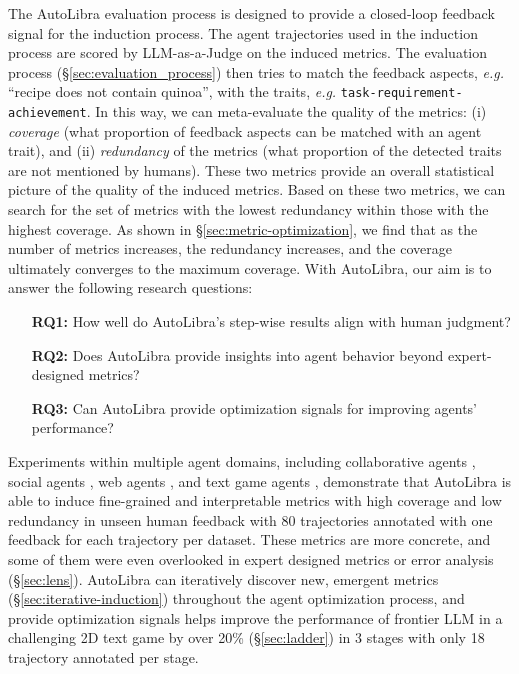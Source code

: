 The AutoLibra evaluation process is designed to provide a closed-loop feedback signal
for the induction process. The agent trajectories used in the induction process
are scored by LLM-as-a-Judge \citep{zheng2023judging} on the induced metrics.
The evaluation process (\S\ref{sec:evaluation_process}) then tries to match the feedback
aspects, \emph{e.g.} ``recipe does not contain quinoa'', with the traits, \emph{e.g.}
\texttt{task-requirement-achievement}. In this way, we can meta-evaluate the quality
of the metrics: (i) \emph{coverage} (what proportion of feedback aspects can be
matched with an agent trait), and (ii) \emph{redundancy} of the metrics (what
proportion of the detected traits are not mentioned by humans). These two
metrics provide an overall statistical picture of the quality of the induced
metrics. Based on these two metrics, we can search for the set of metrics with
the lowest redundancy within those with the highest coverage. As shown in \S\ref{sec:metric-optimization},
we find that as the number of metrics increases, the redundancy increases, and the
coverage ultimately converges to the maximum coverage.
With AutoLibra, our aim is to answer the following research questions:
\begin{itemize}\setlength\itemsep{0em}
	\item[\textbf{RQ1:}] How well do AutoLibra's step-wise results align with human judgment? 

	\item[\textbf{RQ2:}] Does AutoLibra provide insights into agent behavior beyond expert-designed metrics?

	\item[\textbf{RQ3:}] Can AutoLibra provide optimization signals for 
        improving agents' performance?
\end{itemize}

Experiments within multiple agent domains, including collaborative
agents \citep{shao2024collaborative}, social agents \citep{zhousotopia}, web agents
\citep{zhouwebarena,he2024webvoyager}, and text game agents \citep{paglieri2024balrog,cloos2024babaaibreakrules},
demonstrate that AutoLibra is able to induce fine-grained and interpretable metrics
with high coverage and low redundancy in unseen human feedback with 80 trajectories
annotated with one feedback for each trajectory per dataset. These metrics are
more concrete, and some of them were even overlooked in expert designed metrics or
error analysis (\S\ref{sec:lens}). AutoLibra can iteratively discover
new, emergent metrics (\S\ref{sec:iterative-induction}) throughout the agent optimization
process, and provide optimization signals helps
improve the performance of frontier LLM in a challenging 2D text game by over 20\% (\S\ref{sec:ladder}) in 3 stages with only 18 trajectory annotated per stage.

